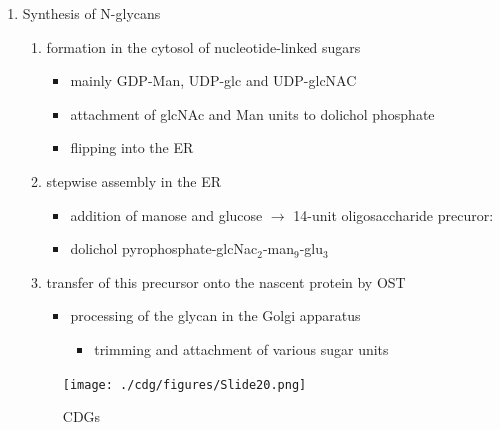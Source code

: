 \documentclass{scrartcl}
\begin{document}
\begin{enumerate}
\item Synthesis of N-glycans
\label{sec:orgbb06b8b}
\begin{enumerate}
\item formation in the cytosol of nucleotide-linked sugars
\begin{itemize}
\item mainly GDP-Man, UDP-glc and UDP-glcNAC
\item attachment of glcNAc and Man units to dolichol phosphate
\item flipping into the ER
\end{itemize}
\item stepwise assembly in the ER
\begin{itemize}
\item addition of manose and glucose \(\to\) 14-unit oligosaccharide precuror:
\item dolichol pyrophosphate-glcNac\(_{\text{2}}\)-man\(_{\text{9}}\)-glu\(_{\text{3}}\)
\end{itemize}
\item transfer of this precursor onto the nascent protein by OST
\begin{itemize}
\item processing of the glycan in the Golgi apparatus
\begin{itemize}
\item trimming and attachment of various sugar units
\end{itemize}
\end{itemize}
\end{enumerate}

\begin{figure}[htbp]
\centering
\texttt{[image: ./cdg/figures/Slide20.png]}
\caption{\label{fig:org9fb8985}
CDGs}
\end{figure}


\end{enumerate}
\end{document}
